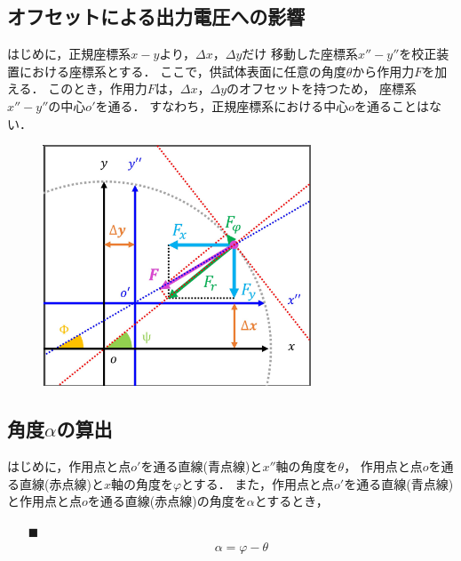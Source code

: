 \documentclass[twocolumn,a4j]{jsarticle}
\begin{document}
\newpage

\subsection{オフセットによる出力電圧への影響}

はじめに，正規座標系$x-y$より，$\Delta x$，$\Delta y$だけ
移動した座標系$x''-y''$を校正装置における座標系とする．
ここで，供試体表面に任意の角度$\theta$から作用力$F$を加える．
このとき，作用力$F$は，$\Delta x$，$\Delta y$のオフセットを持つため，
座標系$x''-y''$の中心$o'$を通る．
すなわち，正規座標系における中心$o$を通ることはない．

\begin{figure}[htbp]
    \footnotesize
    \begin{center}
        \includegraphics[width=80mm]{../images/image_6.png}
        \caption{}
    \end{center}
\end{figure}

\subsection{角度$\alpha$の算出}
はじめに，作用点と点$o'$を通る直線(青点線)と$x''$軸の角度を$\theta$，
作用点と点$o$を通る直線(赤点線)と$x$軸の角度を$\varphi$とする．
また，作用点と点$o'$を通る直線(青点線)と作用点と点$o$を通る直線(赤点線)の角度を$\alpha$とするとき，


\begin{itemize}
    \item [$\blacksquare$] 
          \begin{eqnarray*}
            \alpha = \varphi - \theta
          \end{eqnarray*}
\end{itemize}
\end{document}
